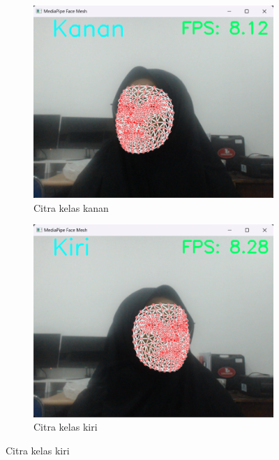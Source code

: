 \begin{figure}[H]
  \centering
  \begin{subfigure}{0.3\textwidth}
      \centering
      \includegraphics[width=\linewidth]{gambar/110 kanan.png}
      \caption{Citra kelas kanan}
      \label{fig:image1}
  \end{subfigure}
  \hfill
  \begin{subfigure}{0.3\textwidth}
      \centering
      \includegraphics[width=\linewidth]{gambar/110 kiri.png}
      \caption{Citra kelas kiri}
      \label{fig:image2}
  \end{subfigure}

\end{figure}
